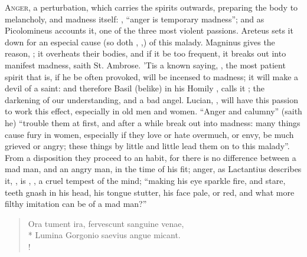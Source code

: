 \lettrine{A}{nger}, a perturbation, which carries the spirits outwards,
preparing the body to melancholy, and madness itself: , \enquote{anger is temporary madness}; and as Picolomineus
accounts it, one of the three most violent passions.
Areteus sets it down for an especial cause (so doth
\Seneca{}, ,) of this malady.
Magninus gives the reason, ; it overheats their bodies, and if it be too frequent, it
breaks out into manifest madness, saith St. Ambrose. 'Tis a known saying,
, the most patient spirit that is, if he
be often provoked, will be incensed to madness; it will make a devil of a
saint: and therefore Basil (belike) in his Homily , calls it ;
the darkening of our understanding, and a bad angel.
Lucian, , will
have this passion to work this effect, especially in old men and women. \enquote{Anger
and calumny} (saith he) \enquote{trouble them at first, and after a while break out
into madness: many things cause fury in women, especially if they love or hate
overmuch, or envy, be much grieved or angry; these things by little and little
lead them on to this malady}. From a disposition they proceed to an habit, for
there is no difference between a mad man, and an angry man, in the time of his
fit; anger, as Lactantius describes it, , is , \etc{}, a
cruel tempest of the mind; \enquote{making his eye sparkle fire, and stare, teeth gnash
in his head, his tongue stutter, his face pale, or red, and what more filthy
imitation can be of a mad man?}

\begin{latin}
\begin{verse}%
Ora tument ira, fervescunt sanguine venae,\\*
Lumina Gorgonio saevius angue micant.\\!
\end{verse}%
\end{latin}

